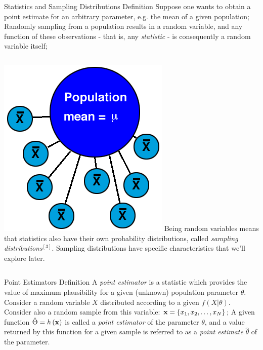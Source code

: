 \documentclass[t]{beamer}
\begin{document}

\begin{ftst}
{Statistics and Sampling Distributions}
{Definition}
Suppose one wants to obtain a point estimate for an arbitrary parameter, e.g. the mean of a given population;
\vone
Randomly sampling from a population results in a random variable, and any function of these observations - that is, any \textit{statistic} - is consequently a random variable itself;
\vhalf
\begin{columns}
\includegraphics[width=\textwidth]{../figs/sam.png}
\vhalf
Being random variables means that statistics also have their own probability distributions, called \textit{sampling distributions}$^{[3]}$. Sampling distributions have specific characteristics that we'll explore later.
\end{columns}
\end{ftst}


\begin{ftst}
{Point Estimators}
{Definition}
A \textit{point estimator} is a statistic which provides the value of maximum plausibility for a given (unknown) population parameter $\theta$.
\vone
Consider a random variable $X$ distributed according to a given $f(X|\theta)$.
\vone
Consider also a random sample from this variable: $\mathbf{x}=\{x_1,x_2,\ldots,x_N\}$;
\vone
A given function $\hat{\Theta}=h\left(\mathbf{x}\right)$ is called a \textit{point estimator} of the parameter $\theta$, and a value returned by this function for a given sample is referred to as a \textit{point estimate} $\hat{\theta}$ of the parameter.
\end{ftst}
\end{document}
